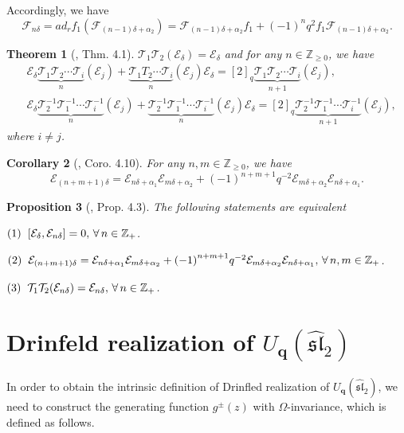 \documentclass[12pt]{amsart}
\newtheorem{theorem}{Theorem}[section]
\newtheorem{coro}[theorem]{Corollary}
\newtheorem{proposition}[theorem]{Proposition}
\numberwithin{equation}{section}
\numberwithin{equation}{section}
\begin{document}
Accordingly, we have
\[\mathcal{F}_{n\delta}={ad}_r f_{1}(\mathcal{F}_{(n-1)\delta+\alpha_{2}})=\mathcal{F}_{(n-1)\delta+\alpha_{2}}f_{1}+{(-1)}^{n}q^{2}f_{1}\mathcal{F}_{(n-1)\delta+\alpha_{2}}.\]
\begin{theorem} [\cite{HZhuang}, Thm. 4.1]
\(\mathcal{T}_1\mathcal{T}_2(\mathcal{E}_{\delta})=\mathcal{E}_{\delta}\) and for any \(n\in\mathbb{Z}_{\ge 0}\), we have
\begin{align*}
&\mathcal{E}_{\delta}\underbrace{\mathcal{T}_{1}\mathcal{T}_{2}\cdots \mathcal{T}_{i}}_{n}(\mathcal{E}_{j})+\underbrace{\mathcal{T}_{1}T_{2}\cdots \mathcal{T}_{i}}_{n}(\mathcal{E}_{j})\mathcal{E}_{\delta}=[2]_q\underbrace{\mathcal{T}_{1}\mathcal{T}_{2}\cdots \mathcal{T}_{i}}_{n+1}(\mathcal{E}_{j}),\\
&\mathcal{E}_{\delta}\underbrace{\mathcal{T}^{-1}_{2}\mathcal{T}^{-1}_{1}\cdots \mathcal{T}^{-1}_{i}}_{n}(\mathcal{E}_{j})+\underbrace{\mathcal{T}^{-1}_{2}\mathcal{T}^{-1}_{1}\cdots \mathcal{T}^{-1}_{i}}_{n}(\mathcal{E}_{j})\mathcal{E}_{\delta}=[2]_q\underbrace{\mathcal{T}^{-1}_{2}\mathcal{T}^{-1}_{1}\cdots \mathcal{T}^{-1}_{i}}_{n+1}(\mathcal{E}_{j}),
\end{align*}
where $i\neq j$.
\end{theorem}
\begin{coro} [\cite{HZhuang}, Coro. 4.10]
For any $n,m\in\mathbb{Z}_{\ge 0}$, we have
$$
\mathcal{E}_{(n+m+1)\delta}=\mathcal{E}_{n\delta+\alpha_{1}}\mathcal{E}_{m\delta+\alpha_{2}}+{(-1)}^{n+m+1}q^{-2}\mathcal{E}_{m\delta+\alpha_{2}}\mathcal{E}_{n\delta+\alpha_{1}}.
$$
\end{coro}
\begin{proposition}[\cite{HZhuang}, Prop. 4.3]
The following statements are equivalent

$(1)\hspace{2mm}[\mathcal{E}_{\delta}, \mathcal{E}_{n\delta}]=0,\,\forall \,n\in\mathbb{Z}_+$.

$(2)\hspace{2mm}\mathcal{E}_{(n+m+1)\delta}=\mathcal{E}_{n\delta+\alpha_{1}}\mathcal{E}_{m\delta+\alpha_{2}}+{(-1)}^{n+m+1}q^{-2}\mathcal{E}_{m\delta+\alpha_{2}}\mathcal{E}_{n\delta+\alpha_{1}},\,\forall \,n,m\in\mathbb{Z}_+$.

$(3)\hspace{2mm} \mathcal{T}_1\mathcal{T}_2(\mathcal{E}_{n\delta})=\mathcal{E}_{n\delta},\,\forall \,n\in\mathbb{Z}_+$.
\end{proposition}


\section{Drinfeld realization of \(U_{\textbf{q}}(\widehat{\mathfrak{sl}}_2)\)}
In order to obtain the intrinsic definition of Drinfled realization of \(  U_{\textbf{q}}(\widehat{\mathfrak{sl}}_2)\), we need to construct the generating function \(g^{\pm}(z)\) with \(\Omega\)-invariance, which is defined as follows.
\end{document}
